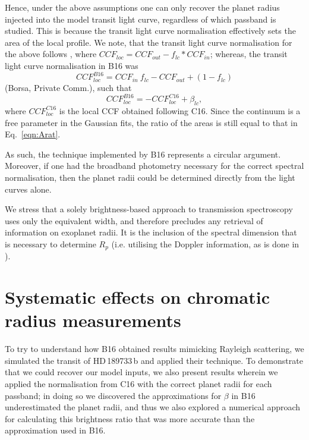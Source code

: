 \documentclass{aa}
\begin{document}
Hence, under the above assumptions one can only recover the planet radius injected into the model transit light curve, regardless of which passband is studied. This is because the transit light curve normalisation effectively sets the area of the local profile. We note, that the transit light curve normalisation for the above follows \citet[][hereafter C16]{cegla16b}, where $CCF_{loc} = CCF_{out} - f_{lc}*CCF_{in}$; whereas, the transit light curve normalisation in B16 was
\begin{equation}
\label{eqn:Bnorm}
CCF_{loc}^{B16} = CCF_{in} \ f_{lc} - CCF_{out} + (1-f_{lc})\end{equation}
(Borsa, Private Comm.), such that 
\begin{equation}
\label{eqn:BnormCnorm}
CCF_{loc}^{B16} = -CCF_{loc}^{C16} + \beta_{lc}, 
\end{equation}
where $CCF_{loc}^{C16}$ is the local CCF obtained following C16. Since the continuum is a free parameter in the Gaussian fits, the ratio of the areas is still equal to that in Eq.~\ref{eqn:Arat}.

As such, the technique implemented by B16 represents a circular argument. Moreover, if one had the broadband photometry necessary for the correct spectral normalisation, then the planet radii could be determined directly from the light curves alone. 

We stress that a solely brightness-based approach to transmission spectroscopy uses only the equivalent width,
and therefore precludes any retrieval of information on exoplanet radii. It is the inclusion of the spectral dimension that is necessary to determine $R_p$ (i.e. utilising the Doppler information, as is done in \citealt{cameron10, digloria15}). 

\vspace{-15pt}   
\section{Systematic effects on chromatic radius measurements}
\label{sec:sim_recover}
To try to understand how B16 obtained results mimicking Rayleigh scattering, we simulated the transit of HD\,189733\,b and applied their technique. To demonstrate that we could recover our model inputs, we also present results wherein we applied the normalisation from C16 with the correct planet radii for each passband; in doing so we discovered the approximations for $\beta$ in B16 underestimated the planet radii, and thus we also explored a numerical approach for calculating this brightness ratio that was more accurate than the approximation used in B16. 
\end{document}
